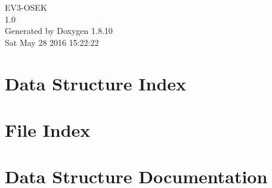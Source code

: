 \documentclass[twoside]{book}
\newcommand{\+}{\discretionary{\mbox{\scriptsize$\hookleftarrow$}}{}{}}
\newcommand{\clearemptydoublepage}{%
  \newpage{\pagestyle{empty}\cleardoublepage}%
}
\begin{document}
\hypersetup{pageanchor=false,
             bookmarks=true,
             bookmarksnumbered=true,
             pdfencoding=unicode
            }
\begin{titlepage}
\vspace*{7cm}
\begin{center}%
{\Large E\+V3-\/\+O\+S\+E\+K \\[1ex]\large 1.\+0 }\\
\vspace*{1cm}
{\large Generated by Doxygen 1.8.10}\\
\vspace*{0.5cm}
{\small Sat May 28 2016 15:22:22}\\
\end{center}
\end{titlepage}
\clearemptydoublepage
\tableofcontents
\clearemptydoublepage
{}
\hypersetup{pageanchor=true}

\chapter{Data Structure Index}

\chapter{File Index}

\chapter{Data Structure Documentation}









\end{document}
